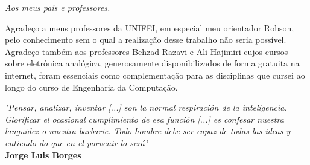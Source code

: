 \documentclass[
	12pt,				%
	oneside,			%
	a4paper,			%
	english,			%
	french,				%
	spanish,			%
	brazil				%
	]{abntex2}
\begin{document}

\frenchspacing

\imprimircapa
\imprimirfolhaderosto*

\begin{dedicatoria}
   \vspace*{\fill}
   \centering
   \noindent
   \textit{ Aos meus pais e professores.} \vspace*{\fill}
\end{dedicatoria}

\begin{agradecimentos}
Agradeço a meus professores da UNIFEI, em especial meu orientador Robson, pelo conhecimento sem o qual a realização desse trabalho não seria possível. Agradeço também aos professores Behzad Razavi e Ali Hajimiri cujos cursos sobre eletrônica analógica, generosamente disponibilizados de forma gratuita na internet, foram essenciais como complementação para as disciplinas que cursei ao longo do curso de Engenharia da Computação. 
\end{agradecimentos}

\begin{epigrafe}
    \vspace*{\fill}
	\begin{flushright}
		\textit{"Pensar, analizar, inventar [...] son la normal
		respiración de la inteligencia. Glorificar el ocasional cumplimiento de esa función [...] es confesar nuestra languidez o nuestra barbarie. Todo hombre debe ser capaz de todas las ideas y entiendo do que en el porvenir lo será"}
		\\
		\textbf{Jorge Luis Borges}
	\end{flushright}
\end{epigrafe}

\end{document}
